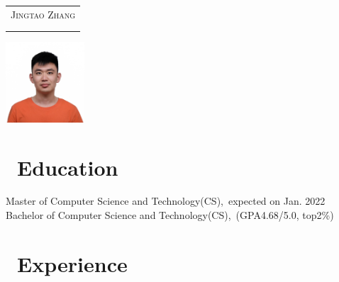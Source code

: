 \documentclass{resume}
\begin{document}

\begin{minipage}{0.7\textwidth}
  \Large{
    \begin{tabu}  { l }
      \scshape{Jingtao Zhang} \\
       \\
       \\
    \end{tabu}
  }
\end{minipage}
\begin{minipage}{0.3\textwidth}
  \raggedleft
  \includegraphics[height=30mm]{avatar}
\end{minipage}

\section{\faGraduationCap\ Education}
Master of Computer Science and Technology(CS),\ expected on Jan. 2022
Bachelor of Computer Science and Technology(CS),\ (GPA4.68/5.0, top2\%)

\section{\faUsers\ Experience}
\end{document}
